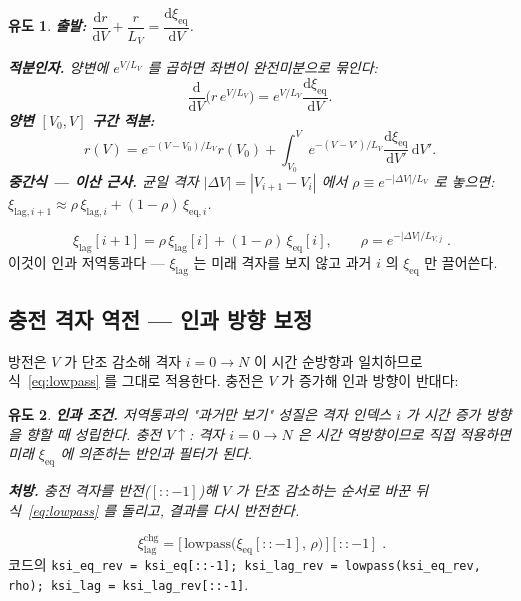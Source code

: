 \documentclass[11pt,a4paper]{article}
\newtheorem*{derivebox}{유도}
\newcommand{\dd}{\mathrm{d}}
\newcommand{\eq}{\mathrm{eq}}
\newcommand{\chg}{\mathrm{chg}}
\newcommand{\lag}{\mathrm{lag}}
\newcommand{\code}[1]{\texttt{#1}}
\begin{document}
\begin{derivebox}
\textbf{출발: } $\dfrac{\dd r}{\dd V}+\dfrac{r}{L_V}=\dfrac{\dd\xi_\eq}{\dd V}$.

\textbf{적분인자.} 양변에 $e^{V/L_V}$ 를 곱하면 좌변이 완전미분으로 묶인다:
\begin{equation*}
\frac{\dd}{\dd V}\!\big(r\,e^{V/L_V}\big)=e^{V/L_V}\frac{\dd\xi_\eq}{\dd V}.
\end{equation*}
\textbf{양변 $[V_0,V]$ 구간 적분:}
\begin{equation*}
r(V)=e^{-(V-V_0)/L_V}r(V_0)+\int_{V_0}^V e^{-(V-V')/L_V}\frac{\dd\xi_\eq}{\dd V'}\,\dd V'.
\end{equation*}
\textbf{중간식 — 이산 근사.} 균일 격자 $|\Delta V|=|V_{i+1}-V_i|$ 에서 $\rho\equiv e^{-|\Delta V|/L_V}$ 로 놓으면:
$\xi_{\lag,i+1}\approx\rho\,\xi_{\lag,i}+(1-\rho)\,\xi_{\eq,i}$.
\end{derivebox}

\begin{equation}
\boxed{\;\xi_{\lag}[i{+}1]=\rho\,\xi_{\lag}[i]+(1-\rho)\,\xi_{\eq}[i],
\qquad\rho=e^{-|\Delta V|/L_{V,j}}\;.}
\label{eq:lowpass}
\end{equation}
이것이 인과 저역통과다 — $\xi_\lag$ 는 미래 격자를 보지 않고 과거 $i$ 의 $\xi_\eq$ 만 끌어쓴다.

\subsection{충전 격자 역전 — 인과 방향 보정}
방전은 $V$ 가 단조 감소해 격자 $i=0\to N$ 이 시간 순방향과 일치하므로 식~\eqref{eq:lowpass} 를 그대로 적용한다. 충전은 $V$ 가 증가해 인과 방향이 반대다:

\begin{derivebox}
\textbf{인과 조건.} 저역통과의 "과거만 보기" 성질은 격자 인덱스 $i$ 가 시간 증가 방향을 향할 때 성립한다.
충전 $V\!\uparrow$: 격자 $i=0\to N$ 은 시간 역방향이므로 직접 적용하면 미래 $\xi_\eq$ 에 의존하는
반인과 필터가 된다.

\textbf{처방.} 충전 격자를 반전($[::-1]$)해 $V$ 가 단조 감소하는 순서로 바꾼 뒤 식~\eqref{eq:lowpass} 를 돌리고,
결과를 다시 반전한다.
\end{derivebox}

\begin{equation}
\boxed{\;\xi_\lag^\chg=\big[\,\text{lowpass}\!\big(\xi_\eq[::-1],\,\rho\big)\,\big][::-1]\;.}
\label{eq:reversal}
\end{equation}
코드의 \code{ksi\_eq\_rev = ksi\_eq[::-1]; ksi\_lag\_rev = lowpass(ksi\_eq\_rev, rho); ksi\_lag = ksi\_lag\_rev[::-1]}.
\end{document}

